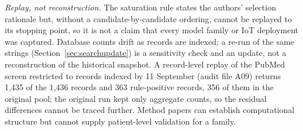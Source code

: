 \documentclass[journal]{IEEEtran}
\begin{document}
\emph{Replay, not reconstruction.} The saturation rule states the authors' selection rationale but, without a candidate-by-candidate ordering, cannot be replayed to its stopping point, so it is not a claim that every model family or IoT deployment was captured. Database counts drift as records are indexed; a re-run of the same strings (Section~\ref{sec:searchupdate}) is a sensitivity check and an update, not a reconstruction of the historical snapshot. A record-level replay of the PubMed screen restricted to records indexed by 11 September (audit file A09) returns 1{,}435 of the 1{,}436 records and 363 rule-positive records, 356 of them in the original pool; the original run kept only aggregate counts, so the residual differences cannot be traced further. Method papers can establish computational structure but cannot supply patient-level validation for a family.
\end{document}
